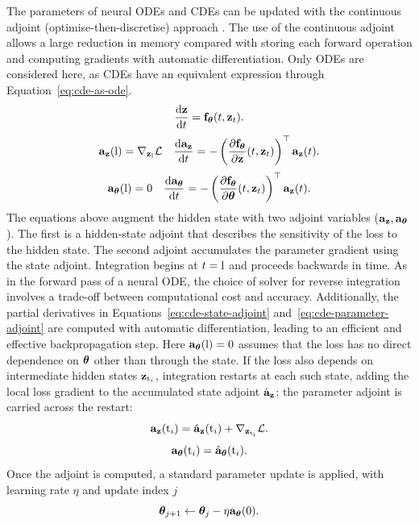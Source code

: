The parameters of neural \acp{ODE} and \acp{CDE} can be updated with the continuous adjoint (optimise-then-discretise) approach \citep{NEURIPS2018_69386f6b,kidger2021thesis}.  The use of the continuous adjoint allows a large reduction in memory compared with storing each forward operation and computing gradients with automatic differentiation. Only \acp{ODE} are considered here, as \acp{CDE} have an equivalent expression through Equation~\ref{eq:cde-as-ode}.
\[
\frac{\mathrm{d} {\mathbf{z}}}{\mathrm{d} t}={\mathbf{f}}_{\bm{\theta}}(t,{\mathbf{z}}_t).
\]
\[
\label{eq:cde-state-adjoint}
{\mathbf{a}}_{\mathbf{z}}({\textnormal{l}})=\nabla_{{\mathbf{z}}_{\textnormal{l}}}\mathcal{L} \quad \frac{\mathrm{d} {\mathbf{a}}_{\mathbf{z}}}{\mathrm{d} t}=-\left(\frac{\partial {\mathbf{f}}_{\bm{\theta}}}{\partial {\mathbf{z}}}(t,{\mathbf{z}}_t)\right)^\top{\mathbf{a}}_{\mathbf{z}}(t).
\]
\[
\label{eq:cde-parameter-adjoint}
{\mathbf{a}}_{\bm{\theta}}({\textnormal{l}})=0 \quad \frac{\mathrm{d} {\mathbf{a}}_{\bm{\theta}}}{\mathrm{d} t}=-\left(\frac{\partial {\mathbf{f}}_{\bm{\theta}}}{\partial {\bm{\theta}}}(t,{\mathbf{z}}_t)\right)^\top{\mathbf{a}}_{\mathbf{z}}(t).
\]
The equations above augment the hidden state with two adjoint variables (${\mathbf{a}}_{\mathbf{z}},{\mathbf{a}}_{\bm{\theta}}$). The first is a hidden-state adjoint that describes the sensitivity of the loss to the hidden state. The second adjoint accumulates the parameter gradient using the state adjoint. Integration begins at $t={\textnormal{l}}$ and proceeds backwards in time. As in the forward pass of a neural \ac{ODE}, the choice of solver for reverse integration involves a trade-off between computational cost and accuracy. Additionally, the partial derivatives in Equations~\ref{eq:cde-state-adjoint} and~\ref{eq:cde-parameter-adjoint} are computed with automatic differentiation, leading to an efficient and effective backpropagation step. Here ${\mathbf{a}}_{\bm{\theta}}({\textnormal{l}})=0$ assumes that the loss has no direct dependence on ${\bm{\theta}}$ other than through the state. If the loss also depends on intermediate hidden states ${\mathbf{z}}_{{\textnormal{t}}_i}$, integration restarts at each such state, adding the local loss gradient to the accumulated state adjoint $\hat{{\mathbf{a}}}_{\mathbf{z}}$; the parameter adjoint is carried across the restart:
\[
{\mathbf{a}}_{\mathbf{z}}({\textnormal{t}}_i)=\hat{{\mathbf{a}}}_{\mathbf{z}}({\textnormal{t}}_i)+\nabla_{{\mathbf{z}}_{{\textnormal{t}}_i}}\mathcal{L}.
\]
\[
{\mathbf{a}}_{\bm{\theta}}({\textnormal{t}}_i)=\hat{{\mathbf{a}}}_{\bm{\theta}}({\textnormal{t}}_i).
\]
Once the adjoint is computed, a standard parameter update is applied, with learning rate $\eta$ and update index $j$
\[
{\bm{\theta}}_{j+1}\leftarrow{\bm{\theta}}_j - \eta{\mathbf{a}}_{\bm{\theta}}(0).
\]

